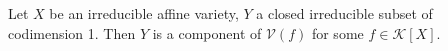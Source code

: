 Let $X$ be an irreducible affine variety, $Y$ a closed irreducible subset of codimension 1. Then $Y$ is a component of $\mathcal{V}(f)$ for some $f \in \mathcal{K}[X]$.
